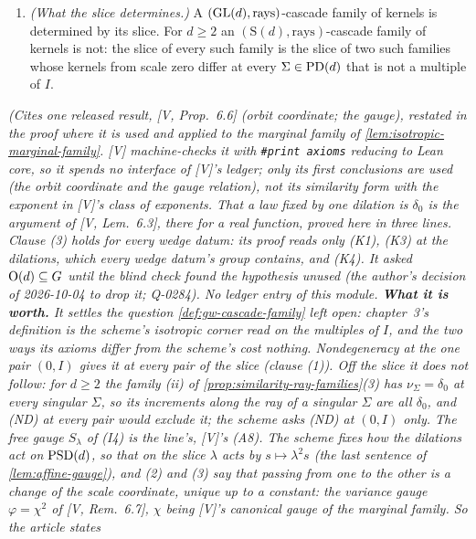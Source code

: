 \begin{proposition}
\begin{enumerate}
$(\nu_{c^{-1}\Sigma,\,c^{-1}\Sigma'})$ is a $(\GL(d), \text{rays})$-cascade family of kernels with
this property for $\psi = c\,\varphi$.
\item \emph{(What the slice determines.)} A $(\GL(d), \text{rays})$-cascade family of kernels is
determined by its slice. For $d \ge 2$ an $(\mathrm S(d), \text{rays})$-cascade family of kernels
is not: the slice of every such family is the slice of two such families whose kernels from scale zero differ at every $\Sigma \in \mathrm{PD}(d)$ that is not a multiple of $I$.
\end{enumerate}
\statusT\quad\emph{(Cites one released result, [V, Prop.~6.6] (orbit coordinate; the gauge),
restated in the proof where it is used and applied to the marginal family of
\ref{lem:isotropic-marginal-family}. [V] machine-checks it with \texttt{\#print axioms} reducing to
Lean core, so it spends no interface of [V]'s ledger; only its first conclusions are used (the orbit
coordinate and the gauge relation), not its similarity form with the exponent in [V]'s class of
\Levy{} exponents. That a law fixed by one dilation is $\delta_0$ is the argument of [V, Lem.~6.3], there for a
real function, proved here in three lines. Clause (3) holds for every wedge datum: its proof reads
only (K1), (K3) at the dilations, which every wedge datum's group contains, and (K4). It asked
$\mathrm{O}(d) \subseteq G$ until the blind check found the hypothesis unused (the author's decision of
2026-10-04 to drop it; Q-0284). No ledger entry of this module. \textbf{What it is worth.} It settles
the question \ref{def:gw-cascade-family} left open: chapter~3's definition is the scheme's isotropic
corner read on the multiples of $I$, and the two ways its axioms differ from the scheme's cost
nothing. Nondegeneracy at the one pair $(0, I)$ gives it at every pair of the slice (clause (1)).
Off the slice it does not follow: for $d \ge 2$ the family (ii) of
\ref{prop:similarity-ray-families}(3) has $\nu_\Sigma = \delta_0$ at every singular $\Sigma$, so its
increments along the ray of a singular $\Sigma$ are all $\delta_0$, and (ND) at every pair would
exclude it; the scheme asks (ND) at $(0, I)$ only. The free gauge $S_\lambda$ of (I4) is the line's, [V]'s (A8). The scheme fixes how
the dilations act on $\mathrm{PSD}(d)$, so that on the slice $\lambda$ acts by $s \mapsto \lambda^2 s$ (the
last sentence of \ref{lem:affine-gauge}), and (2) and (3) say that passing from one to the other is a
change of the scale coordinate, unique up to a constant: the variance gauge $\varphi = \chi^2$ of
[V, Rem.~6.7], $\chi$ being [V]'s canonical gauge of the marginal family. So the article states
}
\end{proposition}
